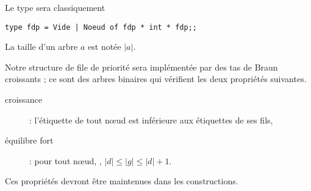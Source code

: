 Le type sera classiquement 
\begin{lstlisting}
type fdp = Vide | Noeud of fdp * int * fdp;;
\end{lstlisting}

La taille d'un arbre $a$ est notée $|a|$.

Notre structure de file de priorité sera implémentée par des tas de Braun croissants ; ce sont des arbres binaires qui vérifient les deux propriétés suivantes.
\begin{description}
  \item[croissance] : l'étiquette de tout nœud est inférieure aux étiquettes de ses fils,
  \item[équilibre fort] : pour tout nœud, , $|d| \le |g| \le |d|+1$.
\end{description}
Ces propriétés devront être maintenues dans les constructions.
